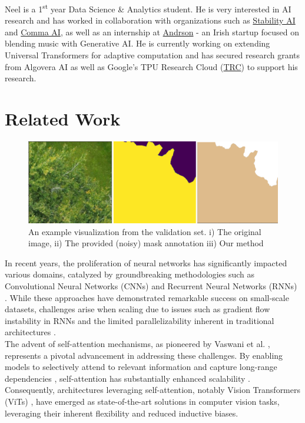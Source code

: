 \documentclass[conference]{IEEEtran}
\begin{document}
Neel is a 1\textsuperscript{st} year Data Science \& Analytics student. He is very interested in AI research and has worked in collaboration with organizations such as \href{https://stability.ai/research}{Stability AI} and \href{https://comma.ai}{Comma AI}, as well as an internship at \href{https://www.techireland.org/companies/andrson}{Andrson} - an Irish startup focused on blending music with Generative AI. He is currently working on extending Universal Transformers \cite{b1, b2} for adaptive computation and has secured research grants from Algovera AI as well as Google's TPU Research Cloud (\href{https://sites.research.google/trc/about/}{TRC}) to support his research.

\section{Related Work}

\begin{figure}
    \centering
    \includegraphics[width=1.1\linewidth]{cropped_model_pred.png}
    \caption{An example visualization from the validation set. i) The original image, ii) The provided (noisy) mask annotation iii) Our method}
    \label{fig:enter-label}
\end{figure}

In recent years, the proliferation of neural networks has significantly impacted various domains, catalyzed by groundbreaking methodologies such as Convolutional Neural Networks (CNNs) \cite{b3, b4} and Recurrent Neural Networks (RNNs) \cite{b5}. While these approaches have demonstrated remarkable success on small-scale datasets, challenges arise when scaling due to issues such as gradient flow instability in RNNs \cite{b6} and the limited parallelizability inherent in traditional architectures \cite{b7, b8}.
\\

The advent of self-attention mechanisms, as pioneered by Vaswani et al. \cite{b9}, represents a pivotal advancement in addressing these challenges. By enabling models to selectively attend to relevant information and capture long-range dependencies \cite{b10}, self-attention has substantially enhanced scalability \cite{b11}. Consequently, architectures leveraging self-attention, notably Vision Transformers (ViTs) \cite{b13}, have emerged as state-of-the-art solutions in computer vision tasks, leveraging their inherent flexibility and reduced inductive biases.\\
\end{document}
